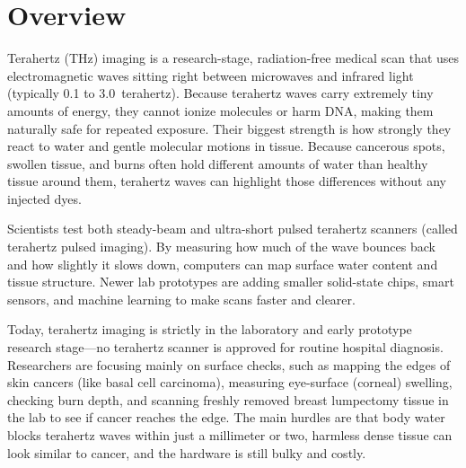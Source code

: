 \label{ch:infographic-terahertz-imaging}

\section{Overview}

Terahertz (THz) imaging is a research-stage, radiation-free medical scan that uses electromagnetic waves sitting right between microwaves and infrared light (typically 0.1 to 3.0~terahertz). Because terahertz waves carry extremely tiny amounts of energy, they cannot ionize molecules or harm DNA, making them naturally safe for repeated exposure. Their biggest strength is how strongly they react to water and gentle molecular motions in tissue. Because cancerous spots, swollen tissue, and burns often hold different amounts of water than healthy tissue around them, terahertz waves can highlight those differences without any injected dyes.

Scientists test both steady-beam and ultra-short pulsed terahertz scanners (called terahertz pulsed imaging). By measuring how much of the wave bounces back and how slightly it slows down, computers can map surface water content and tissue structure. Newer lab prototypes are adding smaller solid-state chips, smart sensors, and machine learning to make scans faster and clearer.

Today, terahertz imaging is strictly in the laboratory and early prototype research stage---no terahertz scanner is approved for routine hospital diagnosis. Researchers are focusing mainly on surface checks, such as mapping the edges of skin cancers (like basal cell carcinoma), measuring eye-surface (corneal) swelling, checking burn depth, and scanning freshly removed breast lumpectomy tissue in the lab to see if cancer reaches the edge. The main hurdles are that body water blocks terahertz waves within just a millimeter or two, harmless dense tissue can look similar to cancer, and the hardware is still bulky and costly.

